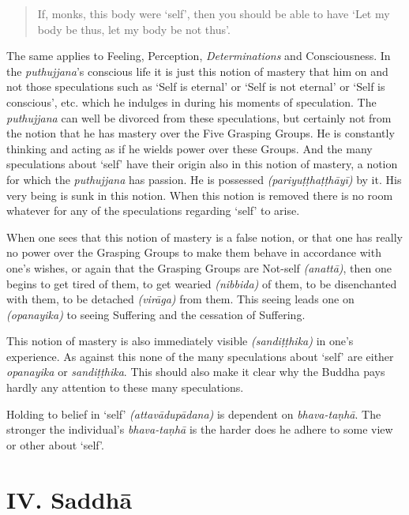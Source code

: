 \begin{quote}
If, monks, this body were `self', then you should be able to have `Let my body be thus, let my body be not thus'.
\end{quote}

The same applies to Feeling, Perception, \emph{Determinations} and Consciousness. In the \emph{puthujjana}'s conscious life it is just this notion of mastery that  him on and not those speculations such as `Self is eternal' or `Self is not eternal' or `Self is conscious', etc. which he indulges in during his moments of speculation. The \emph{puthujjana} can well be divorced from these speculations, but certainly not from the notion that he has mastery over the Five Grasping Groups. He is constantly thinking and acting as if he wields power over these Groups. And the many speculations about `self' have their origin also in this notion of mastery, a notion for which the \emph{puthujjana} has passion. He is possessed \emph{(pariyuṭṭhaṭṭhāyī)} by it. His very being is sunk in this notion. When this notion is removed there is no room whatever for any of the speculations regarding `self' to arise.

When one sees that this notion of mastery is a false notion, or that one has really no power over the Grasping Groups to make them behave in accordance with one's wishes, or again that the Grasping Groups are Not-self \emph{(anattā)}, then one begins to get tired of them, to get wearied \emph{(nibbida)} of them, to be disenchanted with them, to be detached \emph{(virāga)} from them. This seeing leads one on \emph{(opanayika)} to seeing Suffering and the cessation of Suffering.

This notion of mastery is also immediately visible \emph{(sandiṭṭhika)} in one's experience. As against this none of the many speculations about `self' are either \emph{opanayika} or \emph{sandiṭṭhika}. This should also make it clear why the Buddha pays hardly any attention to these many speculations.

Holding to belief in `self' \emph{(attavādupādana)} is dependent on \emph{bhava-taṇhā}. The stronger the individual's \emph{bhava-taṇhā} is the harder does he adhere to some view or other about `self'.

\hypertarget{_iv_saddhux101}{%
\section{IV. Saddhā}\label{_iv_saddhux101}}

